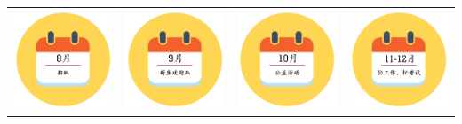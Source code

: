 \documentclass[11pt, oneside,margin=1in]{article}   	%
\begin{document}
\begin{CJK}{UTF8}{bkai}
\begin{tabular}{ l c r r }
 \includegraphics[width=1.2in]{res/8.png} &  \includegraphics[width=1.2in]{res/9.png} &  \includegraphics[width=1.2in]{res/10.png} &  \includegraphics[width=1.2in]{res/11.png} \\
\end{tabular}

\end{CJK}
\end{document}
